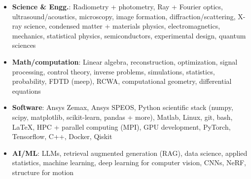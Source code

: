 \begin{itemize}
    \item \textbf{Science \& Engg.}: Radiometry + photometry, Ray + Fourier optics, ultrasound/acoustics, microscopy, image formation, diffraction/scattering, X-ray science, condensed matter + materials physics, electromagnetics, mechanics, statistical physics, semiconductors, experimental design, quantum sciences \par
    \item \textbf{Math/computation}: Linear algebra, reconstruction, optimization, signal processing, control theory, inverse problems, simulations, statistics, probability, FDTD (meep), RCWA, computational geometry, differential equations \par
    \item \textbf{Software}: Ansys Zemax, Ansys SPEOS, Python scientific stack (numpy, scipy, matplotlib, scikit-learn, pandas + more), Matlab, Linux, git, bash, \LaTeX, HPC + parallel computing (MPI), GPU development, PyTorch, Tensorflow, C++, Docker, Qiskit \par
    \item\textbf{AI/ML}: LLMs, retrieval augmented generation (RAG), data science, applied statistics, machine learning, deep learning for computer vision, CNNs, NeRF, structure for motion \par
\end{itemize}
